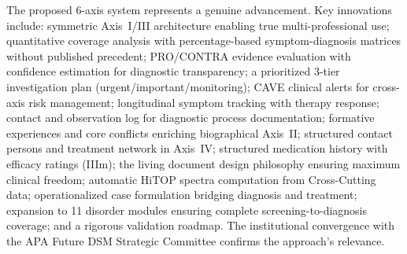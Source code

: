 \documentclass[11pt,a4paper]{article}
\begin{document}
The proposed 6-axis system represents a genuine advancement. Key innovations include: symmetric Axis~I/III architecture enabling true multi-professional use; quantitative coverage analysis with percentage-based symptom-diagnosis matrices without published precedent; PRO/CONTRA evidence evaluation with confidence estimation for diagnostic transparency; a prioritized 3-tier investigation plan (urgent/important/monitoring); CAVE clinical alerts for cross-axis risk management; longitudinal symptom tracking with therapy response; contact and observation log for diagnostic process documentation; formative experiences and core conflicts enriching biographical Axis~II; structured contact persons and treatment network in Axis~IV; structured medication history with efficacy ratings (IIIm); the living document design philosophy ensuring maximum clinical freedom; automatic HiTOP spectra computation from Cross-Cutting data; operationalized case formulation bridging diagnosis and treatment; expansion to 11 disorder modules ensuring complete screening-to-diagnosis coverage; and a rigorous validation roadmap. The institutional convergence with the APA Future DSM Strategic Committee confirms the approach's relevance.


\newpage
{}

\end{document}

